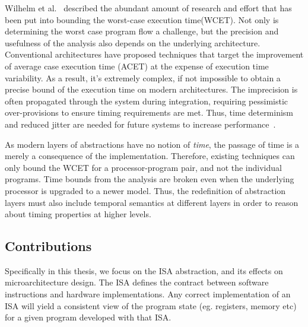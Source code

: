 Wilhelm et al.~\cite{Wilhelm2008survey} described the abundant amount of research and effort that has been put into bounding the worst-case execution time(WCET).   
Not only is determining the worst case program flow a challenge, but the precision and usefulness of the analysis also depends on the underlying architecture\cite{Heckmann2003processor}. 
Conventional architectures have proposed techniques that target the improvement of average case execution time (ACET) at the expense of execution time variability.    
As a result, it's extremely complex, if not impossible to obtain a precise bound of the execution time on modern architectures.
The imprecision is often propagated through the system during integration, requiring pessimistic over-provisions to ensure timing requirements are met.     
Thus, time determinism and reduced jitter are needed for future systems to increase performance~\cite{Sangiovanni-Vincentelli2007automotive}.    

As modern layers of abstractions have no notion of \emph{time}, the passage of time is a merely a consequence of the implementation.  
Therefore, existing techniques can only bound the WCET for a processor-program pair, and not the individual programs.
Time bounds from the analysis are broken even when the underlying processor is upgraded to a newer model.
Thus, the redefinition of abstraction layers must also include temporal semantics at different layers in order to reason about timing properties at higher levels.  

\subsection{Contributions}
Specifically in this thesis, we focus on the ISA abstraction, and its effects on microarchitecture design. 
The ISA defines the contract between software instructions and hardware implementations.
Any correct implementation of an ISA will yield a consistent view of the program state (eg. registers, memory etc) for a given program developed with that ISA.     




